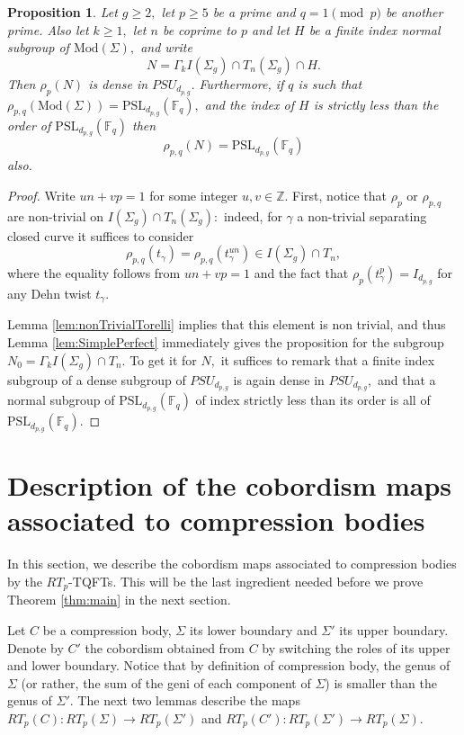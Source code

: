 \documentclass[12pt]{amsart}
\newtheorem{prop}[thm]{Proposition}
\theoremstyle{definition}
\newcommand{\ra}{\rightarrow}
\newcommand{\Z}{\mathbb{Z}}
\begin{document}
\begin{prop}
	\label{prop:densityGammakI} Let $g\geq 2,$ let $p\geq 5$ be a prime and $q=1 \pmod{ p}$ be another prime. Also let $k\geq 1,$ let $n$ be coprime to $p$ and let $H$ be a finite index normal subgroup of $\mathrm{Mod}(\Sigma),$ and write
	$$N=\Gamma_k I(\Sigma_g) \cap T_n(\Sigma_g)\cap H.$$
	Then $\rho_p(N)$ is dense in $PSU_{d_{p,g}}.$ Furthermore, if $q$ is such that $\rho_{p,q}(\mathrm{Mod}(\Sigma))=\mathrm{PSL}_{d_{p,g}}(\mathbb{F}_q),$ and the index of $H$ is strictly less than the order of $\mathrm{PSL}_{d_{p,g}}(\mathbb{F}_q)$ then 
	$$\rho_{p,q}(N)=\mathrm{PSL}_{d_{p,g}}(\mathbb{F}_q)$$
	also. 
\end{prop}
\begin{proof}
	Write $un+vp=1$ for some integer $u,v\in \Z.$
	First, notice that $\rho_p$ or $\rho_{p,q}$ are non-trivial on $I(\Sigma_g)\cap T_n(\Sigma_g):$ indeed, for $\gamma$ a non-trivial separating closed curve it suffices to consider
	$$\rho_{p,q}(t_{\gamma})=\rho_{p,q}(t_{\gamma}^{un})\in I(\Sigma_g)\cap T_n,$$
	where the equality follows from $un+vp=1$ and the fact that $\rho_{p}(t^p_{\gamma})=I_{d_{p,g}}$ for any Dehn twist $t_{\gamma}.$
	
	Lemma \ref{lem:nonTrivialTorelli} implies that this element is non trivial, and thus Lemma \ref{lem:SimplePerfect} immediately gives the proposition for the subgroup $N_0=\Gamma_kI(\Sigma_g)\cap T_n.$ To get it for $N,$ it suffices to remark that a finite index subgroup of a dense subgroup of $PSU_{d_{p,g}}$ is again dense in $PSU_{d_{p,g}},$ and that a normal subgroup of $\mathrm{PSL}_{d_{p,g}}(\mathbb{F}_q)$ of index strictly less than its order is all of $\mathrm{PSL}_{d_{p,g}}(\mathbb{F}_q).$
\end{proof}


\iffalse
\section{Description of the cobordism maps associated to compression bodies}
\label{sec:compression}

In this section, we describe the cobordism maps associated to compression bodies by the $RT_p$-TQFTs. This will be the last ingredient needed before we prove Theorem \ref{thm:main} in the next section.

Let $C$ be a compression body, $\Sigma$ its lower boundary and $\Sigma'$ its upper boundary. Denote by $C'$ the cobordism obtained from $C$ by switching the roles of its upper and lower boundary. Notice that by definition of compression body, the genus of $\Sigma$ (or rather, the sum of the geni of each component of $\Sigma$) is smaller than the genus of $\Sigma'$. The next two lemmas describe the maps $RT_p(C):RT_p(\Sigma)\ra RT_p(\Sigma')$ and $RT_p(C'):RT_p(\Sigma')\ra RT_p(\Sigma)$.
\end{document}
